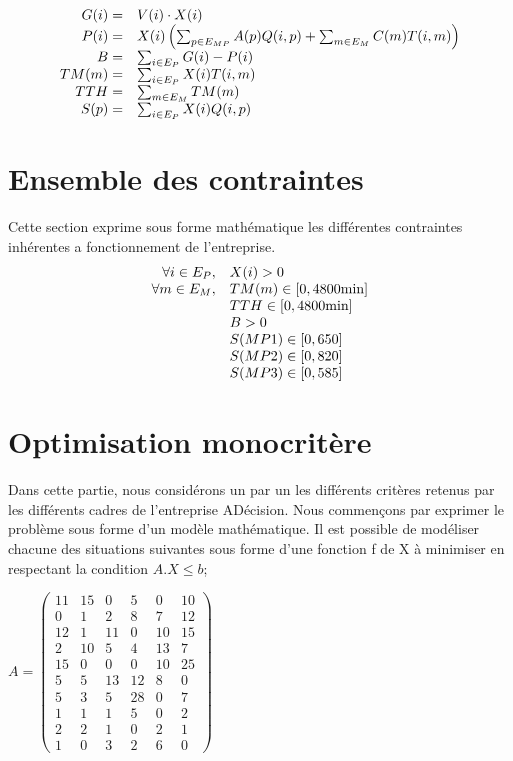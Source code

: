 \documentclass[a4paper, 11pt]{article}
\begin{document}
$$
\begin{array}{r l}
    G(i) =  & V(i)\cdot X(i) \\
    P(i) =  & X(i)\left(\sum_{p\in E_{MP}} A(p)Q(i, p)+ \sum_{m\in E_M} C(m)T(i, m)\right) \\
    B =     & \sum_{i\in E_P} G(i) - P(i) \\
    TM(m) = & \sum_{i\in E_P} X(i)T(i, m) \\
    TTH =   & \sum_{m\in E_M} TM(m) \\
    S(p) =  & \sum_{i\in E_P} X(i)Q(i, p) \\
\end{array}
$$

\section{Ensemble des contraintes}
Cette section exprime sous forme mathématique les différentes contraintes inhérentes a fonctionnement de l'entreprise.
$$
\begin{array}{r l}
    \forall i\in E_P, & X(i) > 0 \\
    \forall m\in E_M, & TM(m) \in [0, 4800\mbox{min}] \\
                      & TTH \in [0, 4800\mbox{min}] \\
                      & B > 0 \\
                      & S(MP1) \in [0, 650] \\
                      & S(MP2) \in [0, 820] \\
                      & S(MP3) \in [0, 585] \\
\end{array}
$$

\section{Optimisation monocritère}

Dans cette partie, nous considérons un par un les différents critères retenus par les différents cadres de l’entreprise ADécision.
    Nous commençons par exprimer le problème sous forme d’un modèle mathématique. Il est possible de modéliser chacune des situations suivantes sous forme d’une fonction f de X  à minimiser en respectant la condition     $A . X \leq b$;

 $A = \begin{pmatrix}
11&15&0&5&0&10 \\
0&1&2&8&7&12\\
12&1&11&0&10&15\\
2&10&5&4&13&7\\
15&0&0&0&10&25\\
5&5&13&12&8&0\\
5&3&5&28&0&7\\
1&1&1&5&0&2\\
2&2&1&0&2&1\\
1&0&3&2&6&0
\end{pmatrix}$\\
\end{document}
